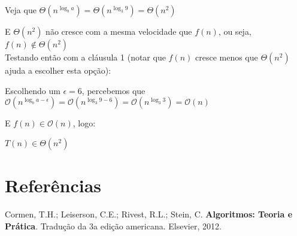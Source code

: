 \documentclass[a4paper, twocolumn]{article}
\theoremstyle{definition}
\begin{document}
	Veja que $\Theta(n^{\log_b a}) = \Theta(n^{\log_3 9}) = \Theta(n^2)$
	
	E $\Theta(n^2)$ não cresce com a mesma velocidade que $f(n)$, ou seja, $f(n) \notin \Theta(n^2)$ \\
	
	Testando então com a cláusula 1 (notar que $f(n)$ cresce menos que $\Theta(n^2)$ ajuda a escolher esta opção):
	
	Escolhendo um $\epsilon = 6$, percebemos que 
	$\mathcal{O}(n^{\log_b a-\epsilon}) = \mathcal{O}(n^{\log_3 9-6}) = \mathcal{O}(n^{\log_3 3}) = \mathcal{O}(n)$
	
	E $f(n) \in \mathcal{O}(n)$, logo:
	
	$T(n) \in \Theta(n^2)$
	
	\section{Referências}
	Cormen, T.H.; Leiserson, C.E.; Rivest, R.L.; Stein, C. \textbf{Algoritmos: Teoria e Prática}. Tradução da 3a edição americana. Elsevier, 2012.   
\end{document}
